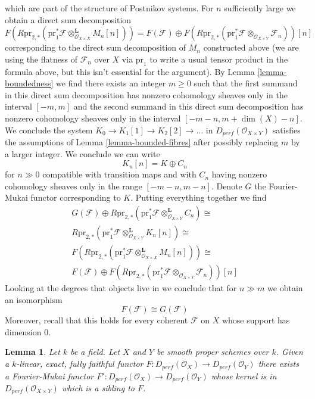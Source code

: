 \documentclass{stacks-project}
\theoremstyle{plain}
\newtheorem{lemma}[subsection]{Lemma}
\theoremstyle{definition}
\theoremstyle{remark}
\numberwithin{equation}{subsection}
\begin{document}
which are part of the structure of Postnikov systems.
For $n$ sufficiently large we obtain a direct sum decomposition
$$
F(R\text{pr}_{2, *}(\text{pr}_1^*\mathcal{F}
\otimes^\mathbf{L}_{\mathcal{O}_{X \times X}} M_n[n]))
=
F(\mathcal{F}) \oplus
F(R\text{pr}_{2, *}(
\text{pr}_1^*\mathcal{F} \otimes_{\mathcal{O}_{X \times Y}} \mathcal{F}_n
))[n]
$$
corresponding to the direct sum decomposition of $M_n$ constructed above
(we are using the flatness of $\mathcal{F}_n$ over $X$ via $\text{pr}_1$
to write a usual tensor product in the formula above, but this isn't
essential for the argument).
By Lemma \ref{lemma-boundedness} we find there exists an integer $m \geq 0$
such that the first summand in this direct sum decomposition has nonzero
cohomology sheaves only in the interval $[-m, m]$ and the
second summand in this direct sum decomposition has nonzero cohomology
sheaves only in the interval $[-m - n, m + \dim(X) - n]$.
We conclude the system $K_0 \to K_1[1] \to K_2[2] \to \ldots$
in $D_{perf}(\mathcal{O}_{X \times Y})$ satisfies the assumptions of
Lemma \ref{lemma-bounded-fibres} after possibly replacing $m$ by
a larger integer. We conclude we can write
$$
K_n[n] = K \oplus C_n
$$
for $n \gg 0$ compatible with transition maps and with $C_n$
having nonzero cohomology sheaves only in the range $[-m - n, m - n]$.
Denote $G$ the Fourier-Mukai functor corresponding to $K$.
Putting everything together we find
$$
\begin{matrix}
G(\mathcal{F}) \oplus
R\text{pr}_{2, *}(
\text{pr}_1^*\mathcal{F} \otimes_{\mathcal{O}_{X \times Y}}^\mathbf{L} C_n)
\cong \\
R\text{pr}_{2, *}(\text{pr}_1^*\mathcal{F}
\otimes^\mathbf{L}_{\mathcal{O}_{X \times Y}} K_n[n]) \cong \\
F(R\text{pr}_{2, *}(\text{pr}_1^*\mathcal{F}
\otimes^\mathbf{L}_{\mathcal{O}_{X \times X}} M_n[n]))
\cong \\
F(\mathcal{F}) \oplus
F(R\text{pr}_{2, *}(
\text{pr}_1^*\mathcal{F} \otimes_{\mathcal{O}_{X \times Y}} \mathcal{F}_n
))[n]
\end{matrix}
$$
Looking at the degrees that objects live in we conclude that for $n \gg m$
we obtain an isomorphism
$$
F(\mathcal{F}) \cong G(\mathcal{F})
$$
Moreover, recall that this holds for every coherent $\mathcal{F}$ on $X$
whose support has dimension $0$.

\begin{lemma}
\label{lemma-fully-faithful}
Let $k$ be a field. Let $X$ and $Y$ be smooth proper schemes over $k$.
Given a $k$-linear, exact, fully faithful functor
$F : D_{perf}(\mathcal{O}_X) \to D_{perf}(\mathcal{O}_Y)$
there exists a Fourier-Mukai functor
$F' : D_{perf}(\mathcal{O}_X) \to D_{perf}(\mathcal{O}_Y)$ whose kernel
is in $D_{perf}(\mathcal{O}_{X \times Y})$ which is a sibling to $F$.
\end{lemma}
\end{document}
